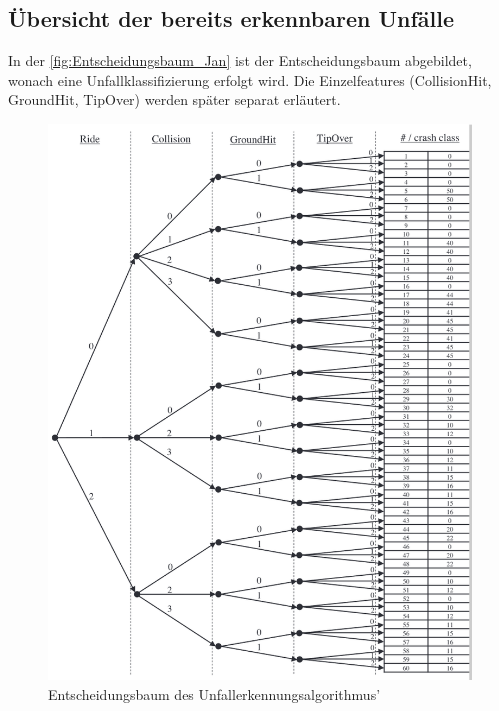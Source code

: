 \subsection{Übersicht der bereits erkennbaren Unfälle}

%

In der \autoref{fig:Entscheidungsbaum_Jan} ist der Entscheidungsbaum abgebildet, wonach eine Unfallklassifizierung erfolgt wird. Die Einzelfeatures (CollisionHit, GroundHit, TipOver) werden später separat erläutert.
\begin{figure}[H] 
	\centering
	\includegraphics[width=\linewidth]{Bilder/Entscheidungsbaum_Jan.png} %
	\caption{Entscheidungsbaum des Unfallerkennungsalgorithmus'\citep{Schneeclassification2021}}
	\label{fig:Entscheidungsbaum_Jan}
\end{figure}

